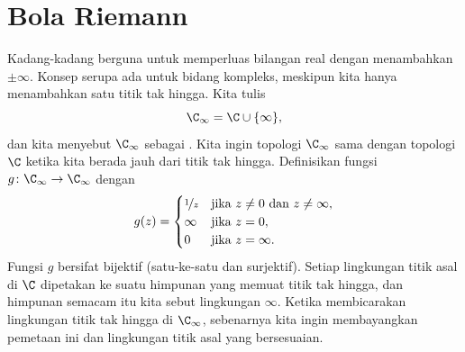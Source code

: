 
\section{Bola Riemann}

Kadang-kadang berguna untuk memperluas bilangan real dengan menambahkan $\pm \infty$.
Konsep serupa ada untuk bidang kompleks, meskipun
kita hanya menambahkan satu titik tak hingga.  Kita tulis
%
%
\begin{equation*}
\C_{\infty} = \C \cup \{ \infty \} ,
\end{equation*}
dan kita menyebut $\C_{\infty}$ sebagai \emph{}.
Kita ingin topologi $\C_\infty$ sama dengan topologi $\C$
ketika kita berada jauh dari titik tak hingga.
Definisikan fungsi $g \colon \C_\infty \to \C_\infty$ dengan
\begin{equation*}
g(z) =
\begin{cases}
\nicefrac{1}{z} & \text{jika } z \neq 0 \text{ dan } z \neq \infty, \\
\infty & \text{jika } z = 0, \\
0 & \text{jika } z = \infty.
\end{cases}
\end{equation*}
Fungsi $g$ bersifat bijektif (satu-ke-satu dan surjektif).
Setiap lingkungan titik asal di $\C$ dipetakan ke suatu himpunan yang
memuat titik tak hingga, dan himpunan semacam itu kita sebut lingkungan
$\infty$.  Ketika membicarakan lingkungan
titik tak hingga di $\C_{\infty}$, sebenarnya kita ingin membayangkan pemetaan ini
dan lingkungan titik asal yang bersesuaian.

